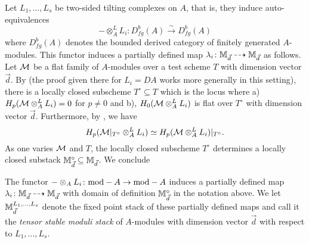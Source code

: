\documentclass[12pt]{amsart}
\begin{document}
Let $L_1,\ldots, L_s$ be two-sided tilting complexes on $A$, that is, they induce auto-equivalences 
$$- \otimes^L_A L_i \colon D^b_{fg}(A) \xrightarrow{\sim} D^b_{fg}(A)$$
where $D^b_{fg}(A)$ denotes the bounded derived category of finitely generated $A$-modules. This functor induces a partially defined map $\lambda_i \colon \mathbb{M}_{\vec{d}} \dashrightarrow \mathbb{M}_{\vec{d}}$ as follows. Let $\mathcal{M}$ be a flat family of $A$-modules over a test scheme $T$ with dimension vector $\vec{d}$. By \cite[Proposition~3.3]{CL} (the proof given there for $L_i = DA$ works more generally in this setting), there is a locally closed subscheme $T^\circ \subseteq T$ which is the locus where a) $H_p(\mathcal{M} \otimes^L_A L_i) = 0$ for $p\neq 0$ and b), $H_0(\mathcal{M} \otimes^L_A L_i)$ is flat over $T^\circ$ with dimension vector $\vec{d}$. Furthermore, by \cite[Lemma~3.2]{CL}, we have
$$ H_p(\mathcal{M}|_{T^\circ} \otimes^L_A L_i) \simeq H_p(\mathcal{M} \otimes^L_A L_i)|_{T^\circ} .$$
As one varies $\mathcal{M}$ and $T$, the locally closed subscheme $T^\circ$ determines a locally closed substack $\mathbb{M}_{\vec{d}}^\circ \subseteq \mathbb{M}_{\vec{d}}$. We conclude
\begin{proposition}  \label{prop:lambdamap}
The functor $- \otimes_A L_i \colon \textup{mod}-A \to \textup{mod}-A$ induces a partially defined map $\lambda_i \colon \mathbb{M}_{\vec{d}} \dashrightarrow \mathbb{M}_{\vec{d}}$ with domain of definition $\mathbb{M}_{\vec{d}}^\circ$ in the notation above. We let $\mathbb{M}_{\vec{d}}^{L_1,\ldots,L_s}$ denote the fixed point stack of these partially defined maps and call it the {\em tensor stable moduli stack} of $A$-modules with dimension vector $\vec{d}$ with respect to $L_1,\ldots, L_s$. 
\end{proposition}
\end{document}
